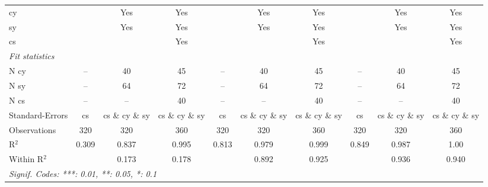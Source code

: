 \begin{tabular}{lccccccccc}
cy &  & Yes & Yes &  & Yes & Yes &  & Yes & Yes\\
sy &  & Yes & Yes &  & Yes & Yes &  & Yes & Yes\\
cs &  &  & Yes &  &  & Yes &  &  & Yes\\
\midrule \emph{Fit statistics}&  & & & & & & & & \\
N cy & -- & 40 & 45 & -- & 40 & 45 & -- & 40 & 45\\
N sy & -- & 64 & 72 & -- & 64 & 72 & -- & 64 & 72\\
N cs & -- & -- & 40 & -- & -- & 40 & -- & -- & 40\\
Standard-Errors& cs&cs \& cy \& sy&cs \& cy \& sy&cs&cs \& cy \& sy&cs \& cy \& sy&cs&cs \& cy \& sy&cs \& cy \& sy\\
Observations & 320&320&360&320&320&360&320&320&360\\
R$^2$ & 0.309&0.837&0.995&0.813&0.979&0.999&0.849&0.987&1.00\\
Within R$^2$ & &0.173&0.178&&0.892&0.925&&0.936&0.940\\
\multicolumn{10}{l}{\emph{Signif. Codes: ***: 0.01, **: 0.05, *: 0.1}}\\
\end{tabular}



